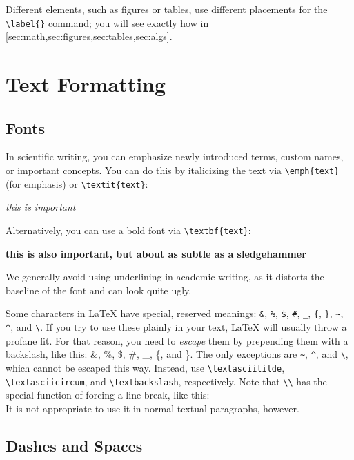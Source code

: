 Different elements, such as figures or tables, use different placements for the \verb|\label{}| command; you will
see exactly how in \cref{sec:math,sec:figures,sec:tables,sec:algs}.

\pagebreak

\section{Text Formatting}
\label{sec:text}

\subsection{Fonts}

In scientific writing, you can emphasize newly introduced terms, custom names, or important concepts.
You can do this by italicizing the text via \verb|\emph{text}| (for emphasis) or \verb|\textit{text}|:
\begin{displayquote}
    \emph{this is important}
\end{displayquote}
Alternatively, you can use a bold font via \verb|\textbf{text}|:
\begin{displayquote}
    \textbf{this is also important, but about as subtle as a sledgehammer}
\end{displayquote}
We generally avoid using underlining in academic writing, as it distorts the baseline of the font and can look quite
ugly.

Some characters in \LaTeX{} have special, reserved meanings: \verb|&|, \verb|%|, \verb|$|, \verb|#|, \verb|_|,
\verb|{|, \verb|}|, \verb|~|, \verb|^|, and \verb|\|. If you try to use these plainly in your text, \LaTeX{} will
usually throw a profane fit. For that reason, you need to \emph{escape} them by prepending them with a backslash,
like this: \&, \%, \$, \#, \_, \{, and \}. The only exceptions are \verb|~|, \verb|^|, and \verb|\|, which cannot be
escaped this way. Instead, use \verb|\textasciitilde|, \verb|\textasciicircum|, and \verb|\textbackslash|,
respectively. Note that \verb|\\| has the special function of forcing a line break, like this: \\ It is not
appropriate to use it in normal textual paragraphs, however.

\subsection{Dashes and Spaces}
\label{sec:text.dashes}

